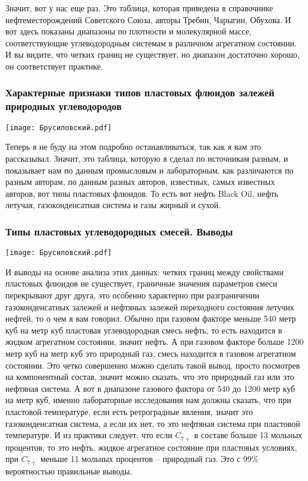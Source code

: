\documentclass[main.tex]{subfiles}
\begin{document}
Значит, вот у нас еще раз.
Это таблица, которая приведена в справочнике нефтеместорождений Советского Союза, авторы Требин, Чарыгин, Обухова.
И вот здесь показаны диапазоны по плотности и молекулярной массе, соответствующие углеводородным системам в различном агрегатном состоянии.
И вы видите, что четких границ не существует, но диапазон достаточно хорошо, он соответствует практике.

\subsubsection{Характерные признаки типов пластовых флюидов залежей природных углеводородов}

\begin{center}
\texttt{[image: Брусиловский.pdf]}
\end{center}

Теперь я не буду на этом подробно останавливаться, так как я вам это рассказывал.
Значит, это таблица, которую я сделал по источникам разным, и показывает нам по данным промысловым и лабораторным, как различаются по разным авторам, по данным разных авторов, известных, самых известных авторов, вот типы пластовых флюидов.
То есть вот нефть Black Oil, нефть летучая, газоконденсатная система и газы жирный и сухой.

\subsubsection{Типы пластовых углеводородных смесей. Выводы}

\begin{center}
\texttt{[image: Брусиловский.pdf]}
\end{center}

И выводы на основе анализа этих данных: четких границ между свойствами пластовых флюидов не существует, граничные значения параметров смеси перекрывают друг друга, это особенно характерно при разграничении газоконденсатных залежей и нефтяных залежей переходного состояния летучих нефтей, то о чем я вам говорил.
Обычно при газовом факторе меньше 540 метр куб на метр куб пластовая углеводородная смесь нефть, то есть находится в жидком агрегатном состоянии, значит нефть.
А при газовом факторе больше 1200 метр куб на метр куб это природный газ, смесь находится в газовом агрегатном состоянии.
Это четко совершенно можно сделать такой вывод, просто посмотрев на компонентный состав, значит можно сказать, что это природный газ или это нефтяная система.
А вот в диапазоне газового фактора от 540 до 1200 метр куб на метр куб, именно лабораторные исследования нам должны сказать, что при пластовой температуре, если есть ретроградные явления, значит это газоконденсатная система, а если их нет, то это нефтяная система при пластовой температуре.
И из практики следует, что если $C_{7+}$ в составе больше 13 мольных процентов, то это нефть, жидкое агрегатное состояние при пластовых условиях, при $C_{7+}$ меньше 11 мольных процентов -- природный газ.
Это с 99\% вероятностью правильные выводы.
\end{document}
